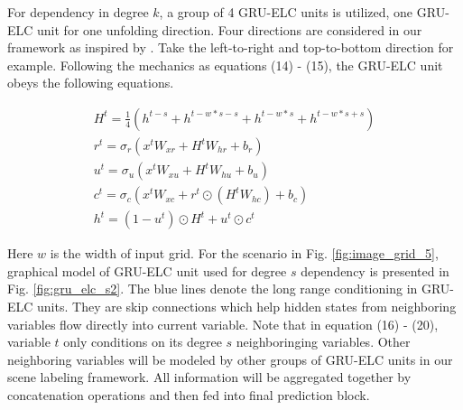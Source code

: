 \documentclass[10pt,twocolumn,letterpaper]{article}
\begin{document}
For dependency in degree $k$, a group of 4 GRU-ELC units is utilized, one GRU-ELC unit for one unfolding direction. Four directions are considered in our framework as inspired by \cite{10, 13, 14}. Take the left-to-right and top-to-bottom direction for example. Following the mechanics as equations (14) - (15), the GRU-ELC unit obeys the following equations.

\begin{gather}
H^t  =   \frac{1}{4}  (h^{t-s} + h^{t- w*s - s} + h^{t - w*s} + h^{t-w*s+s} )  \\
   r^t = \sigma_r (  x^t W_{xr} + H^t W_{hr} + b_r       )    \\
   u^t = \sigma_u (  x^t W_{xu} + H^t W_{hu} + b_u       )    \\   
   c^t = \sigma_c (  x^t W_{xc} +  r^t \odot (  H^t W_{hc} ) + b_c       )    \\
   h^t = (1-u^t) \odot H^t + u^t \odot c^t
\end{gather}

Here $w$ is the width of input grid. For the scenario in Fig. \ref{fig:image_grid_5}, graphical model of GRU-ELC unit used for degree $s$ dependency is presented in Fig. \ref{fig:gru_elc_s2}. The blue lines denote the long range conditioning in GRU-ELC units. They are skip connections which help hidden states from neighboring variables flow directly into current variable. Note that in equation (16) - (20), variable $t$ only conditions on its degree $s$ neighboringing variables. Other neighboring variables will be modeled by other groups of GRU-ELC units in our scene labeling framework. All information will be aggregated together by concatenation operations and then fed into final prediction block.
\end{document}
